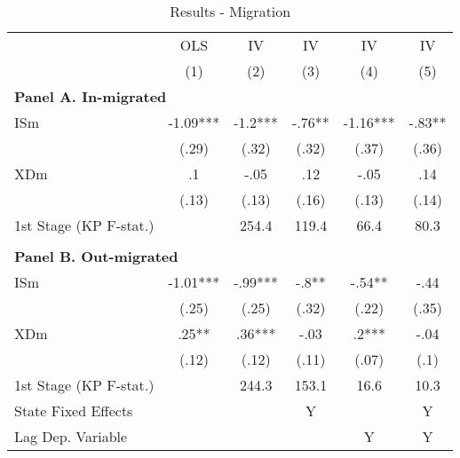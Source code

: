 \noindent \begin{center}
\begin{table}[h!]
\begin{center}
\protect\caption{\label{tab:Table_migrated}Results - Migration}
\begin{centering}
\begin{tabular}{lccccc}
\hline 
 & {\footnotesize{}OLS } & {\footnotesize{}IV } & {\footnotesize{}IV } & {\footnotesize{}IV } & {\footnotesize{}IV }\tabularnewline
 & {\scriptsize{}(1)} & {\scriptsize{}(2)} & {\scriptsize{}(3)} & {\scriptsize{}(4)} & {\scriptsize{}(5)}\tabularnewline
\hline 
\multicolumn{6}{l}{\textbf{\footnotesize{}Panel A. In-migrated}}\tabularnewline
{\footnotesize{}ISm} & {\footnotesize{} -1.09***} & {\footnotesize{} -1.2***} & {\footnotesize{} -.76**} & {\footnotesize{} -1.16***} & {\footnotesize{} -.83**}\tabularnewline
 & {\scriptsize{}(.29)} & {\scriptsize{}(.32)} & {\scriptsize{}(.32)} & {\scriptsize{}(.37)} & {\scriptsize{}(.36)}\tabularnewline
{\footnotesize{}XDm} & {\footnotesize{} .1} & {\footnotesize{} -.05} & {\footnotesize{} .12} & {\footnotesize{} -.05} & {\footnotesize{} .14}\tabularnewline
 & {\scriptsize{}(.13)} & {\scriptsize{}(.13)} & {\scriptsize{}(.16)} & {\scriptsize{}(.13)} & {\scriptsize{}(.14)}\tabularnewline
{\scriptsize{}1st Stage (KP F-stat.)} &  & {\scriptsize{} 254.4} & {\scriptsize{} 119.4} & {\scriptsize{} 66.4} & {\scriptsize{} 80.3}\tabularnewline
 &  &  &  &  & \tabularnewline
\multicolumn{6}{l}{\textbf{\footnotesize{}Panel B. Out-migrated}}\tabularnewline
{\footnotesize{}ISm} & {\footnotesize{} -1.01***} & {\footnotesize{} -.99***} & {\footnotesize{} -.8**} & {\footnotesize{} -.54**} & {\footnotesize{} -.44}\tabularnewline
 & {\scriptsize{}(.25)} & {\scriptsize{}(.25)} & {\scriptsize{}(.32)} & {\scriptsize{}(.22)} & {\scriptsize{}(.35)}\tabularnewline
{\footnotesize{}XDm} & {\footnotesize{} .25**} & {\footnotesize{} .36***} & {\footnotesize{} -.03} & {\footnotesize{} .2***} & {\footnotesize{} -.04}\tabularnewline
 & {\scriptsize{}(.12)} & {\scriptsize{}(.12)} & {\scriptsize{}(.11)} & {\scriptsize{}(.07)} & {\scriptsize{}(.1)}\tabularnewline
{\scriptsize{}1st Stage (KP F-stat.)} &  & {\scriptsize{} 244.3} & {\scriptsize{} 153.1} & {\scriptsize{} 16.6} & {\scriptsize{} 10.3}\tabularnewline
\hline 
{\scriptsize{}State Fixed Effects} &  &  & {\scriptsize{}Y} &  & {\scriptsize{}Y}\tabularnewline
{\scriptsize{}Lag Dep. Variable} &  &  &  & {\scriptsize{}Y} & {\scriptsize{}Y}\tabularnewline
\hline 
\end{tabular}
\par\end{centering}

\end{center}
\end{table}
\end{center}
